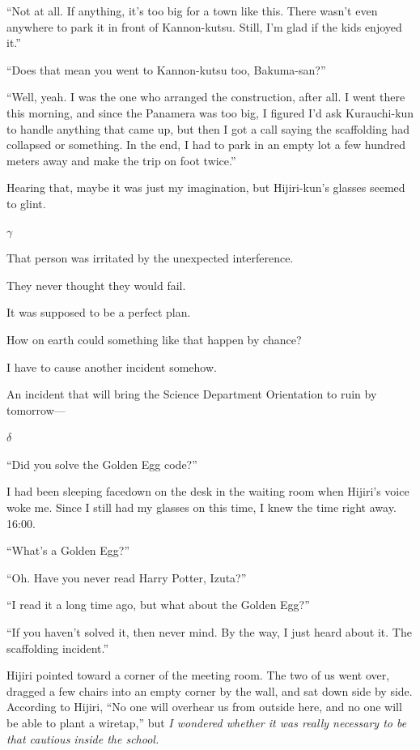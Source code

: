 \documentclass[
    a4paper,
    12pt,
    twoside,
    openany,
    UTF8,
    fontset=windows
]{ctexbook}
\begin{document}
``Not at all. If anything, it's too big for a town like this. There wasn't even anywhere to park it in front of Kannon-kutsu. Still, I'm glad if the kids enjoyed it.''

``Does that mean you went to Kannon-kutsu too, Bakuma-san?''

``Well, yeah. I was the one who arranged the construction, after all. I went there this morning, and since the Panamera was too big, I figured I'd ask Kurauchi-kun to handle anything that came up, but then I got a call saying the scaffolding had collapsed or something. In the end, I had to park in an empty lot a few hundred meters away and make the trip on foot twice.''

Hearing that, maybe it was just my imagination, but Hijiri-kun's glasses seemed to glint.

$\gamma$

That person was irritated by the unexpected interference.

They never thought they would fail.

It was supposed to be a perfect plan.

How on earth could something like that happen by chance?

I have to cause another incident somehow.

An incident that will bring the Science Department Orientation to ruin by tomorrow---

$\delta$

``Did you solve the Golden Egg code?''

I had been sleeping facedown on the desk in the waiting room when Hijiri's voice woke me. Since I still had my glasses on this time, I knew the time right away. 16:00.

``What's a Golden Egg?''

``Oh. Have you never read Harry Potter, Izuta?''

``I read it a long time ago, but what about the Golden Egg?''

``If you haven't solved it, then never mind. By the way, I just heard about it. The scaffolding incident.''

Hijiri pointed toward a corner of the meeting room. The two of us went over, dragged a few chairs into an empty corner by the wall, and sat down side by side. According to Hijiri, ``No one will overhear us from outside here, and no one will be able to plant a wiretap,'' but \textit{I wondered whether it was really necessary to be that cautious inside the school.}
\end{document}

